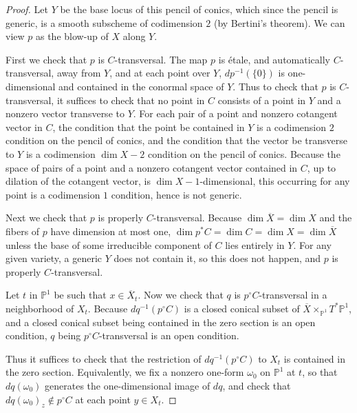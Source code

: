 \begin{proof}

Let $Y$ be the base locus of this pencil of conics, which since the pencil is generic, is a smooth subscheme of codimension $2$ (by Bertini's theorem). We can view $p$ as the blow-up of $X$ along $Y$.

First we check that $p$ is $C$-transversal. The map $p$  is \'{e}tale, and automatically $C$-transversal, away from $Y$, and at each point over $Y$, $dp^{-1} ( \{0\})$ is one-dimensional and contained in the conormal space of $Y$. Thus to check that $p$ is $C$-transversal, it suffices to check that no point in $C$ consists of a point in $Y$ and a nonzero vector transverse to $Y$.  For each pair of a point and nonzero cotangent vector in $C$, the condition that the point be contained in $Y$ is a codimension $2$ condition on the pencil of conics, and the condition that the vector be transverse to $Y$ is a codimension $\dim X-2$ condition on the pencil of conics. Because the space of pairs of a point and a nonzero cotangent vector contained in $C$, up to dilation of the cotangent vector, is $\dim X-1$-dimensional, this occurring for any point is a codimension $1$ condition, hence is not generic.


Next we check that $p$ is properly $C$-transversal.  Because $\dim \overline{X} =\dim X$ and the fibers of $p$ have dimension at most one, $\dim p^* C = \dim C = \dim X = \dim \overline{X}$ unless the base of some irreducible component of $C$ lies entirely in $Y$. For any given variety, a generic $Y$ does not contain it, so this does not happen, and $p$ is properly $C$-transversal.

 Let $t$ in $\mathbb P^1$ be such that $x \in \overline{X}_t$. Now we check that $q$ is $p^\circ C$-transversal in a neighborhood of $X_t$.  Because $dq^{-1}  (p^\circ C)$ is a closed conical subset of $ \overline{X} \times_{\mathbb P^1} T^* \mathbb P^1$, and a closed conical subset being contained in the zero section is an open condition, $q$ being $p^\circ C$-transversal is an open condition.

 Thus it suffices to check that the restriction of $dq^{-1} (p^\circ C)$ to $X_t$ is contained in the zero section. Equivalently, we fix a nonzero one-form $\omega_0$ on $\mathbb P^1$ at $t$, so that $dq(\omega_0)$ generates the one-dimensional image of $dq$, and check that $dq(\omega_0)_z \notin p^\circ C$ at each point $y\in X_t$.



\end{proof}
